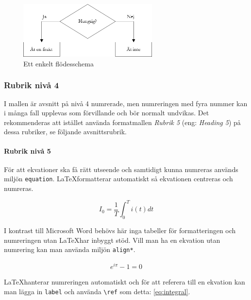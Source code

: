 \begin{figure}[ht!]
    \label{fig:flowchart}
    \centering
    \includegraphics[width=7cm]{images/flowchart}
    \caption{Ett enkelt flödesschema}
\end{figure}

\subsubsection{Rubrik nivå 4}
I mallen är avsnitt på nivå 4 numrerade, men numreringen med fyra nummer
kan i många fall upplevas som förvillande och bör normalt undvikas. Det
rekommenderas att istället använda formatmallen \textit{Rubrik 5} (eng:
\textit{Heading 5}) på dessa rubriker, se följande avsnittsrubrik. 

\paragraph{Rubrik nivå 5}
För att ekvationer ska få rätt utseende och samtidigt kunna numreras används
miljön \verb|equation|. \LaTeX formatterar automatiskt så ekvationen
centreras och numreras. 

\begin{equation}
    \label{eq:integral}
    I_0 = \frac{1}{T}\int_0^T i(t)dt
\end{equation}

I kontrast till Microsoft Word behövs här inga tabeller för formatteringen
och numreringen utan \LaTeX har inbyggt stöd. Vill man ha en ekvation
utan numrering kan man använda miljön \verb|align*|. 

\begin{align*}
    e^{i\pi}-1=0
\end{align*}

\LaTeX hanterar numreringen automatiskt och för att referera till en
ekvation kan man lägga in \verb|label| och använda \verb|\ref| som detta:
\ref{eq:integral}. 
